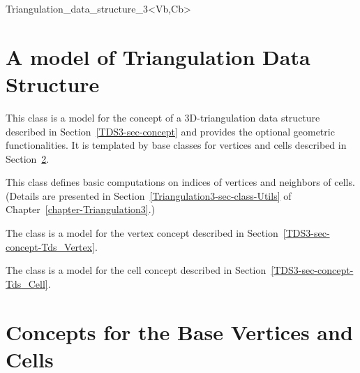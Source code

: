 \begin{ccClassTemplate}{Triangulation_data_structure_3<Vb,Cb>}
\section{A model of Triangulation Data Structure\\ 
\protect {} }
\label{TDS3-sec-class}

This class is a model for the concept of a 3D-triangulation data structure
described in Section~\ref{TDS3-sec-concept} and provides the optional
geometric functionalities. It is templated by base classes for
vertices and cells described in Section~\ref{TDS3-sec-concept-Base}.


This class defines basic computations on indices of vertices and
neighbors of cells. (Details are presented in
Section~\ref{Triangulation3-sec-class-Utils} of
Chapter~\ref{chapter-Triangulation3}.)


The class  is a model for the vertex
concept described in Section~\ref{TDS3-sec-concept-Tds_Vertex}.


The class  is a model for the
cell concept described in Section~\ref{TDS3-sec-concept-Tds_Cell}.


	\end{ccClassTemplate} 

\section{Concepts for the Base Vertices and Cells}
\label{TDS3-sec-concept-Base}

